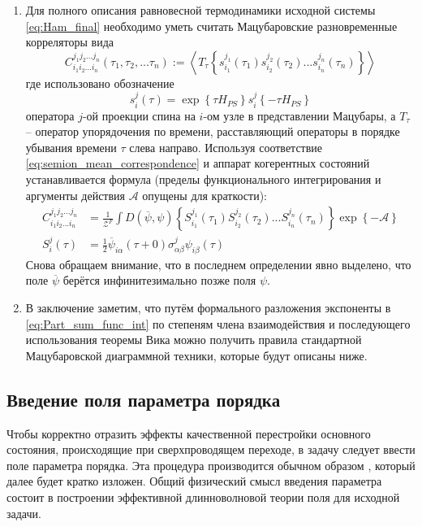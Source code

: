 \begin{enumerate}
	\item Для полного описания равновесной термодинамики исходной системы \eqref{eq:Ham_final} необходимо уметь считать Мацубаровские разновременные корреляторы вида
	\begin{equation}
		\label{eq:Spin_correl_def}
		C^{j_1 j_2 ... j_n}_{i_1 i_2 ... i_n} \left( \tau_1, \tau_2, ... \tau_n \right) := \left\langle T_\tau\left\{ s^{j_1}_{i_1}(\tau_1) s^{j_2}_{i_2}(\tau_2) ... s^{j_n}_{i_n}(\tau_n) \right\} \right\rangle
	\end{equation}
	где использовано обозначение
	$$
	s^j_{i}(\tau) = \exp \left\{ \tau H_{PS} \right\} s^j_i \left\{ - \tau H_{PS} \right\}
	$$
	оператора $j$-ой проекции спина на $i$-ом узле в представлении Мацубары, а $T_\tau$ -- оператор упорядочения по времени, расставляющий операторы в порядке убывания времени $\tau$ слева направо.
	Используя соответствие \eqref{eq:semion_mean_correspondence} и аппарат когерентных состояний устанавливается формула (пределы функционального интегрирования и аргументы действия $\mathcal{A}$ опущены для краткости):
	\begin{align}
		\label{eq:Correlator_funct_int_expression}
		C^{j_1 j_2 ... j_n}_{i_1 i_2 ... i_n} & = \frac{1}{\mathcal{Z}^F} \int D\left(\overline{\psi},\psi\right) \left\{ S^{j_1}_{i_1}(\tau_1) S^{j_2}_{i_2}(\tau_2) ... S^{j_n}_{i_n}(\tau_n) \right\} \exp\left\{ -\mathcal{A} \right\} \\
		\label{eq:Operator_grassman_expression}
		S^j_i(\tau) & = \frac{1}{2} \overline{\psi}_{i\alpha}(\tau + 0) \sigma^j_{\alpha\beta} \psi_{i\beta}(\tau)
	\end{align}
	Снова обращаем внимание, что в последнем определении явно выделено, что поле $\overline{\psi}$ берётся инфинитезимально позже поля $\psi$.
	
	\item В заключение заметим, что путём формального разложения экспоненты в \eqref{eq:Part_sum_func_int} по степеням члена взаимодействия и последующего использования теоремы Вика можно получить правила стандартной Мацубаровской диаграммной техники, которые будут описаны ниже.
	
\end{enumerate}

\subsection{Введение поля параметра порядка}
Чтобы корректно отразить эффекты качественной перестройки основного состояния, происходящие при сверхпроводящем переходе, в задачу следует ввести поле параметра порядка. Эта процедура производится обычном образом \cite{Altland_Simons}, который далее будет кратко изложен. Общий физический смысл введения параметра состоит в построении эффективной длинноволновой теории поля  для исходной задачи.

